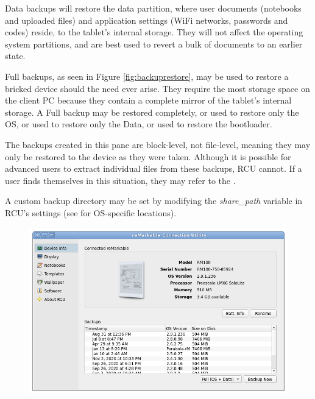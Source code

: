 \documentclass{memoir}
\begin{document}
{Data backups will restore the data partition, where user documents (notebooks and uploaded files) and application settings (WiFi networks, passwords and codes) reside, to the tablet's internal storage. They will not affect the operating system partitions, and are best used to revert a bulk of documents to an earlier state.

Full backups, as seen in Figure \ref{fig:backuprestore}, may be used to restore a bricked device should the need ever arise. They require the most storage space on the client PC because they contain a complete mirror of the tablet's internal storage. A Full backup may be restored completely, or used to restore only the OS, or used to restore only the Data, or used to restore the bootloader.

The backups created in this pane are block-level, not file-level, meaning they may only be restored to the device as they were taken. Although it is possible for advanced users to extract individual files from these backups, RCU cannot. If a user finds themselves in this situation, they may refer to the .

A custom backup directory may be set by modifying the \textit{share\_path} variable in RCU's settings (see  for OS-specific locations).


\newpage
\mbox{}
\vfill
\begin{figure}[h]
  \centering
  \includegraphics[width=\linewidth]{images/device-info.png}
  \caption{}
  \label{fig:deviceinfo}
\end{figure}

\vfill

}
\end{document}
